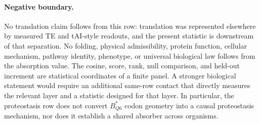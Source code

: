 \paragraph{Negative boundary.}
No translation claim follows from this row: translation was represented elsewhere by measured TE and tAI-style readouts, and the present statistic is downstream of that separation.  No folding, physical admissibility, protein function, cellular mechanism, pathway identity, phenotype, or universal biological law follows from the absorption value.  The cosine, score, rank, null comparison, and held-out increment are statistical coordinates of a finite panel.  A stronger biological statement would require an additional same-row contact that directly measures the relevant layer and a statistic designed for that layer.  In particular, the proteostasis row does not convert $B^{*}_{Q6}$ codon geometry into a causal proteostasis mechanism, nor does it establish a shared absorber across organisms.
